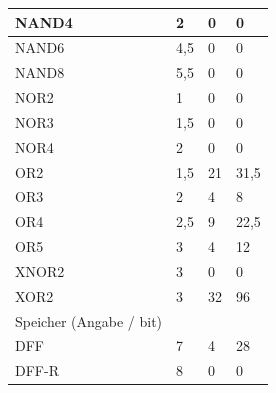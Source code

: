 \documentclass[11pt]{report}
\begin{document}
\begin{table}[]
\begin{tabular}{llll}
			\multicolumn{1}{|l|}{NAND4}                  & \multicolumn{1}{l|}{2}     & \multicolumn{1}{l|}{0}  & \multicolumn{1}{l|}{0}     \\ \hline
			\multicolumn{1}{|l|}{NAND6}                  & \multicolumn{1}{l|}{4,5}   & \multicolumn{1}{l|}{0}  & \multicolumn{1}{l|}{0}     \\ \hline
			\multicolumn{1}{|l|}{NAND8}                  & \multicolumn{1}{l|}{5,5}   & \multicolumn{1}{l|}{0}  & \multicolumn{1}{l|}{0}     \\ \hline
			\multicolumn{1}{|l|}{NOR2}                   & \multicolumn{1}{l|}{1}     & \multicolumn{1}{l|}{0}  & \multicolumn{1}{l|}{0}     \\ \hline
			\multicolumn{1}{|l|}{NOR3}                   & \multicolumn{1}{l|}{1,5}   & \multicolumn{1}{l|}{0}  & \multicolumn{1}{l|}{0}     \\ \hline
			\multicolumn{1}{|l|}{NOR4}                   & \multicolumn{1}{l|}{2}     & \multicolumn{1}{l|}{0}  & \multicolumn{1}{l|}{0}     \\ \hline
			\multicolumn{1}{|l|}{OR2}                    & \multicolumn{1}{l|}{1,5}   & \multicolumn{1}{l|}{21} & \multicolumn{1}{l|}{31,5}  \\ \hline
			\multicolumn{1}{|l|}{OR3}                    & \multicolumn{1}{l|}{2}     & \multicolumn{1}{l|}{4}  & \multicolumn{1}{l|}{8}     \\ \hline
			\multicolumn{1}{|l|}{OR4}                    & \multicolumn{1}{l|}{2,5}   & \multicolumn{1}{l|}{9}  & \multicolumn{1}{l|}{22,5}  \\ \hline
			\multicolumn{1}{|l|}{OR5}                    & \multicolumn{1}{l|}{3}     & \multicolumn{1}{l|}{4}  & \multicolumn{1}{l|}{12}    \\ \hline
			\multicolumn{1}{|l|}{XNOR2}                  & \multicolumn{1}{l|}{3}     & \multicolumn{1}{l|}{0}  & \multicolumn{1}{l|}{0}     \\ \hline
			\multicolumn{1}{|l|}{XOR2}                   & \multicolumn{1}{l|}{3}     & \multicolumn{1}{l|}{32} & \multicolumn{1}{l|}{96}    \\ \hline
			\multicolumn{1}{|l}{Speicher (Angabe / bit)} &                            &                         & \multicolumn{1}{l|}{}      \\ \hline
			\multicolumn{1}{|l|}{DFF}                    & \multicolumn{1}{l|}{7}     & \multicolumn{1}{l|}{4}  & \multicolumn{1}{l|}{28}    \\ \hline
			\multicolumn{1}{|l|}{DFF-R}                  & \multicolumn{1}{l|}{8}     & \multicolumn{1}{l|}{0}  & \multicolumn{1}{l|}{0}     \\ \hline

\end{tabular}
\end{table}
\end{document}
